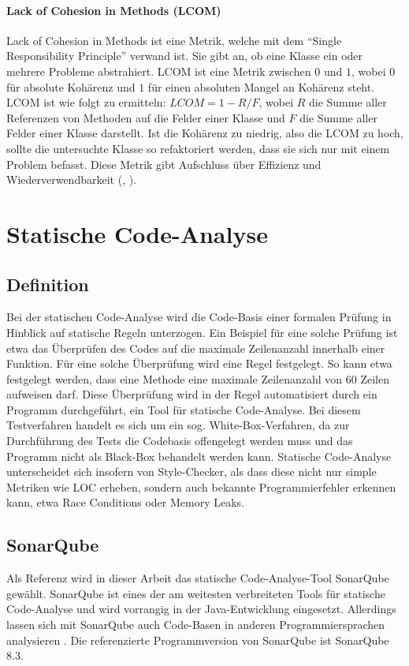 \documentclass[a4paper, 12pt]{article}
\begin{document}
\paragraph{Lack of Cohesion in Methods (LCOM)}
Lack of Cohesion in Methods ist eine Metrik, welche mit dem \enquote{Single Responsibility Principle} verwand ist.
Sie gibt an, ob eine Klasse ein oder mehrere Probleme abstrahiert.
LCOM ist eine Metrik zwischen $0$ und $1$, wobei $0$ für absolute Kohärenz und $1$ für einen absoluten Mangel an Kohärenz steht.
LCOM ist wie folgt zu ermitteln:  $LCOM = 1 - R / F$, wobei $R$ die Summe aller Referenzen von Methoden auf die Felder einer Klasse und $F$ die Summe aller Felder einer Klasse darstellt.
Ist die Kohärenz zu niedrig, also die LCOM zu hoch, sollte die untersuchte Klasse so refaktoriert werden, dass sie sich nur mit einem Problem befasst.
Diese Metrik gibt Aufschluss über Effizienz und Wiederverwendbarkeit (\textcite{Metrics_OO_design}, \textcite{Linda_softwarequality}).

\section{Statische Code-Analyse}
\subsection{Definition}
Bei der statischen Code-Analyse wird die Code-Basis einer formalen Prüfung in Hinblick auf statische Regeln unterzogen.
Ein Beispiel für eine solche Prüfung ist etwa das Überprüfen des Codes auf die maximale Zeilenanzahl innerhalb einer Funktion.
Für eine solche Überprüfung wird eine Regel festgelegt.
So kann etwa festgelegt werden, dass eine Methode eine maximale Zeilenanzahl von 60 Zeilen aufweisen darf.
Diese Überprüfung wird in der Regel automatisiert durch ein Programm durchgeführt, ein Tool für statische Code-Analyse.
Bei diesem Testverfahren handelt es sich um ein sog. White-Box-Verfahren, da zur Durchführung des Tests die Codebasis offengelegt werden muss und das Programm nicht als Black-Box behandelt werden kann.
Statische Code-Analyse unterscheidet sich insofern von Style-Checker, als dass diese nicht nur simple Metriken wie LOC erheben, sondern auch bekannte Programmierfehler erkennen kann, etwa Race Conditions oder Memory Leaks.

\subsection{SonarQube}
Als Referenz wird in dieser Arbeit das statische Code-Analyse-Tool SonarQube gewählt.
SonarQube ist eines der am weitesten verbreiteten Tools für statische Code-Analyse und wird vorrangig in der Java-Entwicklung eingesetzt.
Allerdings lassen sich mit SonarQube auch Code-Basen in anderen Programmiersprachen analysieren \parencite{sonarqube_languages}.
Die referenzierte Programmversion von SonarQube ist SonarQube 8.3.
\end{document}
